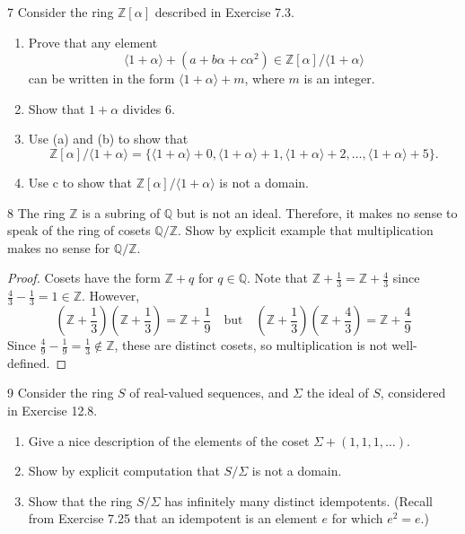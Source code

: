 \begin{problem}{7}
    Consider the ring $\mathbb{Z}[\alpha]$ described in Exercise 7.3.
    \begin{enumerate}
        \item[(a)] Prove that any element
        \[\langle 1 + \alpha \rangle + (a + b\alpha + c\alpha^2) \in \mathbb{Z}[\alpha]/\langle 1 + \alpha \rangle\]
        can be written in the form $\langle 1 + \alpha \rangle + m$, where $m$ is an integer.
        \item[(b)] Show that $1 + \alpha$ divides 6.
        \item[(c)] Use (a) and (b) to show that
        \[\mathbb{Z}[\alpha]/\langle 1 + \alpha \rangle = \{\langle 1 + \alpha \rangle + 0,
        \langle 1 + \alpha \rangle + 1, \langle 1 + \alpha \rangle + 2, \ldots,
        \langle 1 + \alpha \rangle + 5\}.\]
        \item[(d)] Use c to show that $\mathbb{Z}[\alpha]/\langle 1 + \alpha \rangle$ is not
        a domain.
    \end{enumerate}
\end{problem}
\unsolved

\begin{problem}{8}
    The ring $\mathbb{Z}$ is a subring of $\mathbb{Q}$
        but is not an ideal. Therefore, it makes no sense to speak 
        of the ring of cosets $\mathbb{Q}/\mathbb{Z}$.
    Show by explicit example that multiplication makes no sense for $\mathbb{Q}/\mathbb{Z}$.
\end{problem}
\solved

\begin{proof}
    Cosets have the form $\mathbb{Z} + q$ for $q \in \mathbb{Q}$. Note that $\mathbb{Z} + \frac{1}{3} = \mathbb{Z} + \frac{4}{3}$ since $\frac{4}{3} - \frac{1}{3} = 1 \in \mathbb{Z}$. However,
    \[
        \left(\mathbb{Z} + \frac{1}{3}\right)\left(\mathbb{Z} + \frac{1}{3}\right) = \mathbb{Z} + \frac{1}{9}
        \quad \text{but} \quad
        \left(\mathbb{Z} + \frac{1}{3}\right)\left(\mathbb{Z} + \frac{4}{3}\right) = \mathbb{Z} + \frac{4}{9}
    \]
    Since $\frac{4}{9} - \frac{1}{9} = \frac{1}{3} \notin \mathbb{Z}$, these are distinct cosets, so multiplication is not well-defined.
\end{proof}

\begin{problem}{9}
    Consider the ring $S$ of real-valued sequences, and $\Sigma$ the ideal of $S$,
    considered in Exercise 12.8.
    \begin{enumerate}
        \item[(a)] Give a nice description of the elements of the coset
        $\Sigma + (1, 1, 1, \ldots)$.
        \item[(b)] Show by explicit computation that $S/\Sigma$ is not a domain.
        \item[(c)] Show that the ring $S/\Sigma$ has infinitely many distinct idempotents.
        (Recall from Exercise 7.25 that an idempotent is an element $e$ for which
        $e^2 = e$.)
    \end{enumerate}
\end{problem}
\unsolved


